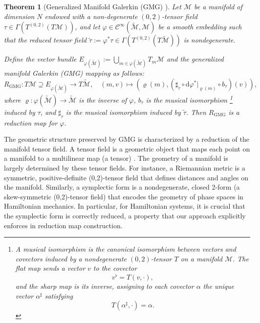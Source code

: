 \documentclass{article}
\theoremstyle{plain}
\newtheorem{theorem}{Theorem}[section]
\theoremstyle{definition}
\theoremstyle{remark}
\begin{document}
\begin{theorem}[Generalized Manifold Galerkin (GMG) \cite{buchfink2024}]
\label{thm: generalized_manifold_galerkin}
Let $\mathcal{M}$ be a manifold of dimension $N$ endowed with a non-degenerate $(0,2)$-tensor field $\tau \in \Gamma(T^{(0,2)}(T\mathcal{M}))$, and let $\varphi \in \mathcal{C}^{\infty}(\tilde{\mathcal{M}}, \mathcal{M})$ be a smooth embedding such that the reduced tensor field $\tilde{\tau} := \varphi^*\tau \in \Gamma(T^{(0,2)}(T\tilde{\mathcal{M}}))$ is nondegenerate. 

Define the vector bundle $E_{\varphi(\tilde{\mathcal{M}})} := \bigcup_{m \in \varphi(\tilde{\mathcal{M}})} T_m\mathcal{M}$ and the generalized manifold Galerkin (GMG) mapping as follows:
\begin{equation*}
   R_{\text{GMG}}: T\mathcal{M} \supseteq E_{\varphi(\tilde{\mathcal{M}})} \to T\tilde{\mathcal{M}}, \quad (m,v) \mapsto \left(\varrho(m), \left(\sharp_{\check{\tau}} \circ \mathrm{d}\varphi^*|_{\varrho(m)} \circ b_{\tau}\right)(v)\right), 
\end{equation*}
where $\varrho: \varphi(\tilde{\mathcal{M}}) \to \tilde{\mathcal{M}}$ is the inverse of $\varphi$, $b_{\tau}$ is the musical isomorphism \footnote{A \emph{musical isomorphism} is the canonical isomorphism between vectors and covectors induced by a nondegenerate \((0,2)\)-tensor \(T\) on a manifold \(\mathcal{M}\). The \emph{flat} map sends a vector \(v\) to the covector
\[
v^\flat = T(v, \cdot),
\]
and the \emph{sharp} map is its inverse, assigning to each covector \(\alpha\) the unique vector \(\alpha^\sharp\) satisfying
\[
T(\alpha^\sharp, \cdot) = \alpha.
\]
} induced by $\tau$, and $\sharp_{\tau}$ is the musical isomorphism induced by $\tilde{\tau}$. Then $R_{\text{GMG}}$ is a reduction map for $\varphi$.
\end{theorem}
The geometric structure preserved by GMG  is characterized by a reduction of the manifold tensor field.
A tensor field is a geometric object that maps each point on a manifold to a multilinear map (a tensor) \cite{grinfeld2013introduction}. The geometry of a manifold is largely determined by these tensor fields. For instance, a Riemannian metric is a symmetric, positive-definite (0,2)-tensor field that defines distances and angles on the manifold. Similarly, a symplectic form is a nondegenerate, closed 2-form (a skew-symmetric (0,2)-tensor field) that encodes the geometry of phase spaces in Hamiltonian mechanics. In particular, for Hamiltonian systems, it is crucial that the symplectic form is correctly reduced, a property that our approach explicitly enforces in reduction map construction.
\end{document}
